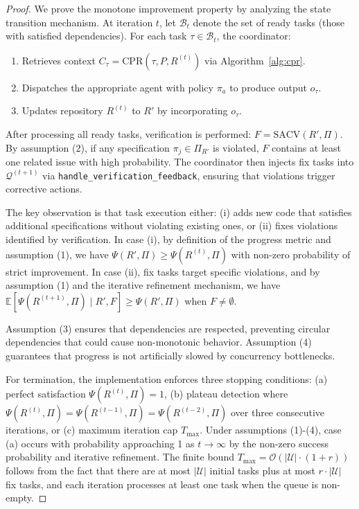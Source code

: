 \documentclass{ieeeaccess}
\begin{document}
\begin{proof}
We prove the monotone improvement property by analyzing the state transition mechanism. At iteration \(t\), let \(\mathcal{B}_t\) denote the set of ready tasks (those with satisfied dependencies). For each task \(\tau \in \mathcal{B}_t\), the coordinator:
\begin{enumerate}
\item Retrieves context \(C_\tau = \text{CPR}(\tau, P, R^{(t)})\) via Algorithm~\ref{alg:cpr}.
\item Dispatches the appropriate agent with policy \(\pi_a\) to produce output \(o_\tau\).
\item Updates repository \(R^{(t)}\) to \(R'\) by incorporating \(o_\tau\).
\end{enumerate}

After processing all ready tasks, verification is performed: \(F = \text{SACV}(R', \Pi)\). By assumption (2), if any specification \(\pi_j \in \Pi_{R'}\) is violated, \(F\) contains at least one related issue with high probability. The coordinator then injects fix tasks into \(\mathcal{Q}^{(t+1)}\) via \texttt{handle\_verification\_feedback}, ensuring that violations trigger corrective actions.

The key observation is that task execution either: (i) adds new code that satisfies additional specifications without violating existing ones, or (ii) fixes violations identified by verification. In case (i), by definition of the progress metric and assumption (1), we have \(\Psi(R', \Pi) \geq \Psi(R^{(t)}, \Pi)\) with non-zero probability of strict improvement. In case (ii), fix tasks target specific violations, and by assumption (1) and the iterative refinement mechanism, we have \(\mathbb{E}[\Psi(R^{(t+1)}, \Pi) \mid R', F] \geq \Psi(R', \Pi)\) when \(F \neq \emptyset\).

Assumption (3) ensures that dependencies are respected, preventing circular dependencies that could cause non-monotonic behavior. Assumption (4) guarantees that progress is not artificially slowed by concurrency bottlenecks.

For termination, the implementation enforces three stopping conditions: (a) perfect satisfaction \(\Psi(R^{(t)}, \Pi) = 1\), (b) plateau detection where \(\Psi(R^{(t)}, \Pi) = \Psi(R^{(t-1)}, \Pi) = \Psi(R^{(t-2)}, \Pi)\) over three consecutive iterations, or (c) maximum iteration cap \(T_{\max}\). Under assumptions (1)-(4), case (a) occurs with probability approaching 1 as \(t \to \infty\) by the non-zero success probability and iterative refinement. The finite bound \(T_{\max} = \mathcal{O}(|\mathcal{U}| \cdot (1 + r))\) follows from the fact that there are at most \(|\mathcal{U}|\) initial tasks plus at most \(r \cdot |\mathcal{U}|\) fix tasks, and each iteration processes at least one task when the queue is non-empty.
\end{proof}
\end{document}

